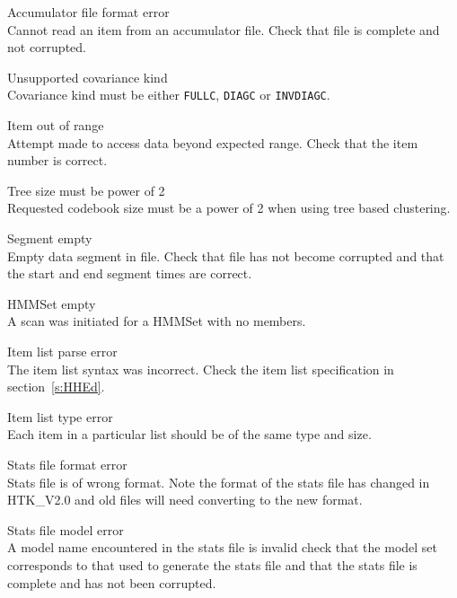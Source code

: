 \begin{itemize}
\begin{itemize}
    Accumulator file format error\\
        Cannot read an item from an accumulator file. Check
        that file is complete and not corrupted.

    Unsupported covariance kind\\
        Covariance kind must be either \texttt{FULLC}, \texttt{DIAGC} or 
        \texttt{INVDIAGC}.

    Item out of range\\
        Attempt made to access data beyond expected range. Check that 
        the item number is correct.

    Tree size must be power of 2\\
        Requested codebook size must be a power of 2 when
        using tree based clustering.

    Segment empty\\
        Empty data segment in file. Check that file has not
        become corrupted and that the start and end segment times
        are correct.

\end{itemize}


\begin{itemize}
    HMMSet empty\\
        A scan was initiated for a HMMSet with no members.

    Item list parse error\\
        The item list syntax was incorrect.  Check the item list specification
        in section~\ref{s:HHEd}.

    Item list type error\\
        Each item in a particular list should be of the same type and size.

    Stats file format error\\
        Stats file is of wrong format.  Note the format of the stats file has 
        changed in HTK\_V2.0 and old files will need converting to the new
        format.

    Stats file model error\\
        A model name encountered in the stats file is invalid check that the
        model set corresponds to that used to generate the stats file and that
        the stats file is complete and has not been corrupted.


\end{itemize}
\end{itemize}
